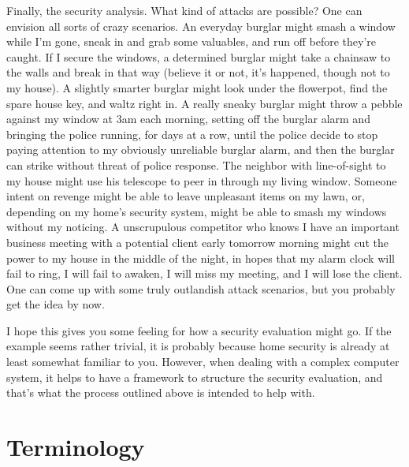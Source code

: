\documentclass[11pt]{article}
\begin{document}
Finally, the security analysis. What kind of
attacks are possible? One can envision all sorts of crazy
scenarios. An everyday burglar might smash a window while I'm gone,
sneak in and grab some valuables, and run off before they're
caught. If I secure the windows, a determined burglar might take a
chainsaw to the walls and break in that way (believe it or not, it's
happened, though not to my house). 
A slightly smarter burglar might look under the flowerpot,
find the spare house key, and waltz right in. A really sneaky burglar
might throw a pebble against my window at 3am each morning, setting
off the burglar alarm and bringing the police running, for days at a
row, until the police decide to stop paying attention to my obviously
unreliable burglar alarm, and then the burglar can strike without
threat of police response. The neighbor with line-of-sight to my house
might use his telescope to peer in through my living window. Someone
intent on revenge might be able to leave unpleasant items on my lawn,
or, depending on my home's security system, might be able to smash my
windows without my noticing. A unscrupulous competitor who knows I
have an important business meeting with a potential client early
tomorrow morning might cut the power to my house in the middle of the
night, in hopes that my alarm clock will fail to ring, I will fail to
awaken, I will miss my meeting, and I will lose the client. One can
come up with some truly outlandish attack scenarios, but you probably
get the idea by now.

I hope this gives you some feeling for how a
security evaluation might go. If the example seems rather trivial, it
is probably because home security is already at least somewhat
familiar to you. However, when dealing with a complex computer system,
it helps to have a framework to structure the security evaluation, and
that's what the process outlined above is intended to help with.

\section{Terminology}
\end{document}
